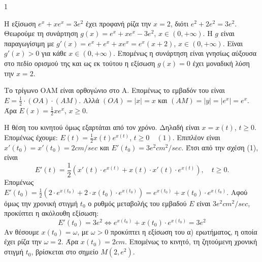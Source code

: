 \begin{ylh}{1}
    \item [Ύλη από εικόνα]
\end{ylh}
\begin{alist}
    \item Η εξίσωση $e^x + xe^x = 3e^2$ έχει προφανή ρίζα την $x = 2$, διότι $e^2 + 2e^2 = 3e^2$.
    Θεωρούμε τη συνάρτηση $g(x) = e^x + xe^x - 3e^2$, $x \in (0, +\infty)$.
    Η $g$ είναι παραγωγίσιμη με $g'(x) = e^x + e^x + xe^x = e^x(x + 2)$, $x \in (0, +\infty)$.
    Είναι $g'(x) > 0$ για κάθε $x \in (0, +\infty)$.
    Επομένως η συνάρτηση είναι γνησίως αύξουσα στο πεδίο ορισμού της και ως εκ τούτου η εξίσωση $g(x) = 0$ έχει μοναδική λύση την $x = 2$.

    \item
    \begin{rlist}
        \item Το τρίγωνο ΟΑΜ είναι ορθογώνιο στο Α.
        Επομένως το εμβαδόν του είναι $E = \frac{1}{2} \cdot (OA) \cdot (AM)$.
        Αλλά $(OA) = |x| = x$ και $(AM) = |y| = |e^x| = e^x$.
        Άρα $E(x) = \frac{1}{2}xe^x$, $x \geq 0$.

        \item Η θέση του κινητού όμως εξαρτάται από τον χρόνο. Δηλαδή είναι $x = x(t)$, $t \geq 0$.
        Επομένως έχουμε: $E(t) = \frac{1}{2}x(t)e^{x(t)}$, $t \geq 0 \quad (1)$.
        Επιπλέον είναι $x'(t_0) = x'(t_0) = 2cm/sec$ και $E'(t_0) = 3e^2 cm^2/sec$.
        Έτσι από την σχέση (1), είναι
        \[ E'(t) = \frac{1}{2}(x'(t) \cdot e^{x(t)} + x(t) \cdot x'(t) \cdot e^{x(t)}), \quad t \geq 0. \]
        Επομένως $E'(t_0) = \frac{1}{2}(2 \cdot e^{x(t_0)} + 2 \cdot x(t_0) \cdot e^{x(t_0)}) = e^{x(t_0)} + x(t_0) \cdot e^{x(t_0)}.$
        Αφού όμως την χρονική στιγμή $t_0$ ο ρυθμός μεταβολής του εμβαδού $E$ είναι $3e^2 cm^2/sec$, προκύπτει η ακόλουθη εξίσωση:
        \[ E'(t_0) = 3e^2 \Leftrightarrow e^{x(t_0)} + x(t_0) \cdot e^{x(t_0)} = 3e^2 \]
        Αν θέσουμε $x(t_0) = \omega$, με $\omega > 0$ προκύπτει η εξίσωση του α) ερωτήματος, η οποία έχει ρίζα την $\omega = 2$. Άρα $x(t_0) = 2cm$.
        Επομένως το κινητό, τη ζητούμενη χρονική στιγμή $t_0$, βρίσκεται στο σημείο $M(2, e^2)$.
    \end{rlist}
\end{alist}
